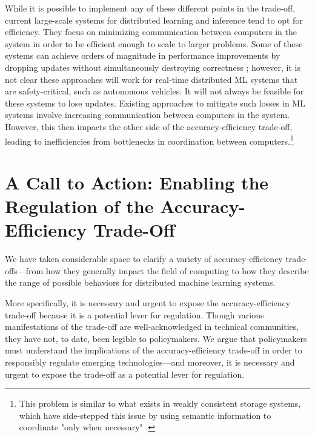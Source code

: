 \documentclass[sigplan,screen]{acmart}
\begin{document}
While it is possible to implement any of these different points in the trade-off, current large-scale systems for distributed learning and inference tend to opt for efficiency. They focus on minimizing communication between computers in the system in order to be efficient enough to scale to larger problems. Some of these systems can achieve orders of magnitude in performance improvements by dropping updates without simultaneously destroying correctness \cite{Niu2011hogwild, tsitsiklis1986stochastic}; however, it is not clear these approaches will work for real-time distributed ML systems that are safety-critical, such as autonomous vehicles. It will not always be feasible for these systems to lose updates. Existing approaches to mitigate such losses in ML systems involve increasing communication between computers in the system. However, this then impacts the other side of the accuracy-efficiency trade-off, leading to inefficiencies from bottlenecks in coordination between computers.\footnote{This problem is similar to what exists in weakly consistent storage systems, which have side-stepped this issue by using semantic information to coordinate "only when necessary" \cite{Badrinath1992beyondcommutativity, DiPippo1997semanticcc, Herman2016typeaware, molina1983semantic, weihl1988commutativity}.}

\section{A Call to Action: Enabling the Regulation of the Accuracy-Efficiency Trade-Off} \label{sec:policy}
We have taken considerable space to clarify a variety of accuracy-efficiency trade-offs---from how they generally impact the field of computing to how they describe the range of possible behaviors for distributed machine learning systems.

More specifically, it is necessary and urgent to expose the accuracy-efficiency trade-off because it is a potential lever for regulation. Though various manifestations of the trade-off are well-acknowledged in technical communities, they have not, to date, been legible to policymakers. We argue that policymakers must understand the implications of the accuracy-efficiency trade-off in order to responsibly regulate emerging technologies---and moreover, it is necessary and urgent to expose the trade-off as a potential lever for regulation. 
\end{document}
